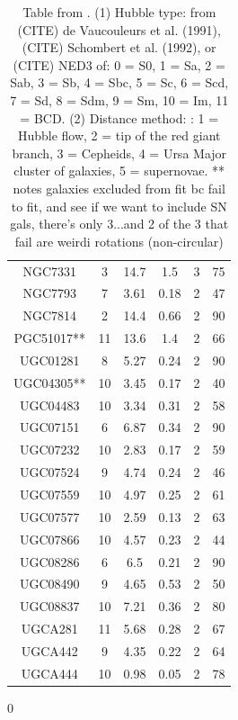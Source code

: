\documentclass[reprint,%
 amsmath,amssymb,
 aps,
]{revtex4-1}
\begin{document}
\begin{table}[]
\begin{tabular}{|c|c|c|c|c|c|}
NGC7331& 	3& 	14.7& 	1.5&    	3& 	75\\
NGC7793& 	7& 	3.61& 	0.18&   	2& 	47\\
NGC7814& 	2&  	14.4& 	0.66& 	2& 	90\\
PGC51017**& 	11& 	13.6& 	1.4& 	2& 	66\\
UGC01281& 	8&   	5.27& 	0.24& 	2& 	90\\
UGC04305**& 	10& 	3.45& 	0.17& 	2& 	40\\
UGC04483& 	10& 	3.34& 	0.31& 	2& 	58\\
UGC07151& 	6& 	6.87& 	0.34&   	2& 	90\\
UGC07232& 	10& 	2.83& 	0.17& 	2& 	59\\
UGC07524& 	9& 	4.74& 	0.24& 	    2& 	46\\
UGC07559& 	10& 	4.97& 	0.25& 	2& 	61\\
UGC07577& 	10& 	2.59& 	0.13& 	2& 	63\\
UGC07866& 	10& 	4.57& 	0.23& 	2& 	44\\
UGC08286& 	6& 	6.5& 	0.21&   	2& 	90\\
UGC08490& 	9& 	4.65& 	0.53&   	2& 	50\\
UGC08837& 	10& 	7.21& 	0.36& 	2& 	80\\
UGCA281& 	11& 	5.68& 	0.28& 	2& 	67\\
UGCA442& 	9& 	4.35& 	0.22& 	    2& 	64\\
UGCA444& 	10& 	0.98& 	0.05& 	2& 	78\\
    \hline \hline           
      \end{tabular}
      \caption{Table from  \citet{2016Lelli}. 
      (1) Hubble type:  from (CITE) de
Vaucouleurs et al. (1991), (CITE) Schombert et al. (1992), or (CITE) NED3
of: 0 = S0, 1 = Sa, 2 = Sab,
3 = Sb, 4 = Sbc, 5 = Sc, 6 = Scd, 7 = Sd, 8 = Sdm,
9 = Sm, 10 = Im, 11 = BCD.  (2) Distance method: : 1 = Hubble flow,
2 = tip of the red giant branch, 3 = Cepheids, 4 = Ursa Major
cluster of galaxies, 5 = supernovae. ** notes galaxies excluded from fit bc fail to fit, and see if we want to include SN gals, there's only 3...and 2 of the 3 that fail are weirdi rotations (non-circular)}
0      \label{tab:Tset}
  \end{table}
  
 
\end{document}
